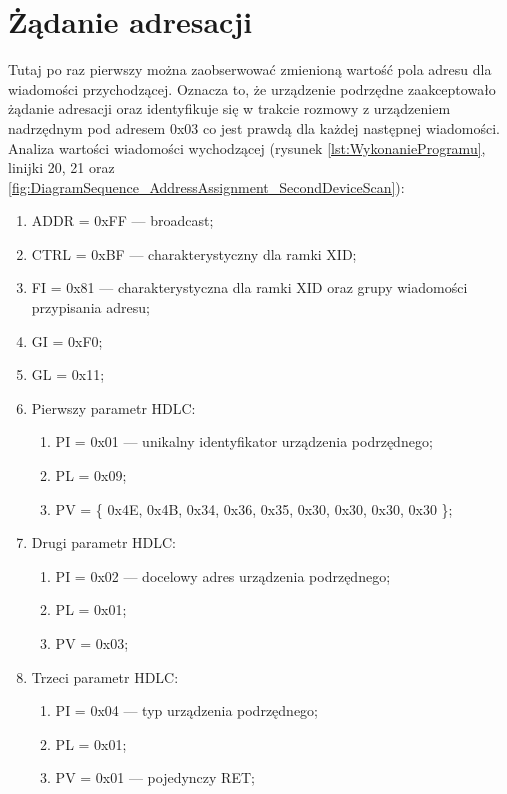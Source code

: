 \section{Żądanie adresacji}
Tutaj po raz pierwszy można zaobserwować zmienioną wartość pola adresu dla wiadomości
przychodzącej. Oznacza to, że urządzenie podrzędne zaakceptowało żądanie adresacji 
oraz identyfikuje się w trakcie rozmowy z urządzeniem nadrzędnym pod adresem 0x03 co
jest prawdą dla każdej następnej wiadomości.
\newline\newline
Analiza wartości wiadomości wychodzącej 
(rysunek \ref{lst:WykonanieProgramu}, linijki {20, 21} oraz \ref{fig:DiagramSequence_AddressAssignment_SecondDeviceScan}):
\begin{enumerate}
    \item ADDR = 0xFF --- broadcast;
    \item CTRL = 0xBF --- charakterystyczny dla ramki XID;
    \item FI = 0x81 --- charakterystyczna dla ramki XID oraz grupy wiadomości przypisania adresu;
    \item GI = 0xF0;
    \item GL = 0x11;
    \item Pierwszy parametr HDLC:
    \begin{enumerate}
        \item PI = 0x01 --- unikalny identyfikator urządzenia podrzędnego;
        \item PL = 0x09;
        \item PV = \{ 0x4E, 0x4B, 0x34, 0x36, 0x35, 0x30, 0x30, 0x30, 0x30 \};
    \end{enumerate}
    \item Drugi parametr HDLC:
    \begin{enumerate}
        \item PI = 0x02 --- docelowy adres urządzenia podrzędnego;
        \item PL = 0x01;
        \item PV = 0x03;
    \end{enumerate}
    \item Trzeci parametr HDLC:
    \begin{enumerate}
        \item PI = 0x04 --- typ urządzenia podrzędnego;
        \item PL = 0x01;
        \item PV = 0x01 --- pojedynczy RET;
    \end{enumerate}
\end{enumerate}
